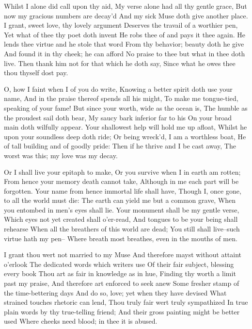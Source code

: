 \documentclass[twocolumn]{book}
\begin{document}
Whilst I alone did call upon thy aid,
My verse alone had all thy gentle grace,
But now my gracious numbers are decay'd
And my sick Muse doth give another place.
I grant, sweet love, thy lovely argument
Deserves the travail of a worthier pen,
Yet what of thee thy poet doth invent
He robs thee of and pays it thee again.
He lends thee virtue and he stole that word
From thy behavior; beauty doth he give
And found it in thy cheek; he can afford
No praise to thee but what in thee doth live.
  Then thank him not for that which he doth say,
  Since what he owes thee thou thyself dost pay.


O, how I faint when I of you do write,
Knowing a better spirit doth use your name,
And in the praise thereof spends all his might,
To make me tongue-tied, speaking of your fame!
\numerus*{}But since your worth, wide as the ocean is,
The humble as the proudest sail doth bear,
My saucy bark inferior far to his
On your broad main doth wilfully appear.
Your shallowest help will hold me up afloat,
Whilst he upon your soundless deep doth ride;
Or being wreck'd, I am a worthless boat,
He of tall building and of goodly pride:
  Then if he thrive and I be cast away,
  The worst was this; my love was my decay.


Or I shall live your epitaph to make,
Or you survive when I in earth am rotten;
From hence your memory death cannot take,
Although in me each part will be forgotten.
Your name from hence immortal life shall have,
Though I, once gone, to all the world must die:
The earth can yield me but a common grave,
When you entombed in men's eyes shall lie.
Your monument shall be my gentle verse,
Which eyes not yet created shall o'er-read,
And tongues to be your being shall rehearse
When all the breathers of this world are dead;
  You still shall live--such virtue hath my pen--
  Where breath most breathes, even in the mouths of men.


I grant thou wert not married to my Muse
And therefore mayst without attaint o'erlook
The dedicated words which writers use
Of their fair subject, blessing every book
Thou art as fair in knowledge as in hue,
Finding thy worth a limit past my praise,
And therefore art enforced to seek anew
Some fresher stamp of the time-bettering days
And do so, love; yet when they have devised
What strained touches rhetoric can lend,
Thou truly fair wert truly sympathized
In true plain words by thy true-telling friend;
  And their gross painting might be better used
  Where cheeks need blood; in thee it is abused.
\end{document}
